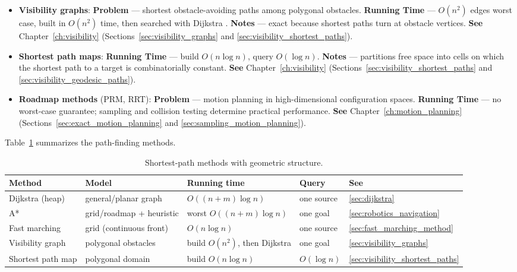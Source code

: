 \begin{itemize}
  \item \textbf{Visibility graphs}:
    \textbf{Problem} --- shortest obstacle-avoiding paths among polygonal
    obstacles. \textbf{Running Time} --- $O(n^2)$ edges worst case, built
    in $O(n^2)$ time, then searched with Dijkstra \cite{berg2008}.
    \textbf{Notes} --- exact because shortest paths turn at obstacle
    vertices. \textbf{See} Chapter~\ref{ch:visibility}
    (Sections~\ref{sec:visibility_graphs} and \ref{sec:visibility_shortest_paths}).
  \item \textbf{Shortest path maps}:
    \textbf{Running Time} --- build $O(n\log n)$, query $O(\log n)$.
    \textbf{Notes} --- partitions free space into cells on which the
    shortest path to a target is combinatorially constant. \textbf{See}
    Chapter~\ref{ch:visibility} (Sections~\ref{sec:visibility_shortest_paths}
    and \ref{sec:visibility_geodesic_paths}).
  \item \textbf{Roadmap methods} (PRM, RRT):
    \textbf{Problem} --- motion planning in high-dimensional configuration
    spaces. \textbf{Running Time} --- no worst-case guarantee; sampling and
    collision testing determine practical performance. \textbf{See}
    Chapter~\ref{ch:motion_planning} (Sections~\ref{sec:exact_motion_planning}
    and \ref{sec:sampling_motion_planning}).
\end{itemize}

Table~\ref{tbl:appalgs_graphs} summarizes the path-finding methods.

\begin{table}[htbp]
\centering
\begin{tabular}{lllll}
\toprule
Method & Model & Running time & Query & See \\
\midrule
Dijkstra (heap)    & general/planar graph & $O((n+m)\log n)$ & one source & \ref{sec:dijkstra} \\
A*                 & grid/roadmap + heuristic & worst $O((n+m)\log n)$ & one goal & \ref{sec:robotics_navigation} \\
Fast marching      & grid (continuous front) & $O(n\log n)$ & one source & \ref{sec:fast_marching_method} \\
Visibility graph   & polygonal obstacles & build $O(n^2)$, then Dijkstra & one goal & \ref{sec:visibility_graphs} \\
Shortest path map  & polygonal domain & build $O(n\log n)$ & $O(\log n)$ & \ref{sec:visibility_shortest_paths} \\
\bottomrule
\end{tabular}
\caption{Shortest-path methods with geometric structure.}
\label{tbl:appalgs_graphs}
\end{table}

